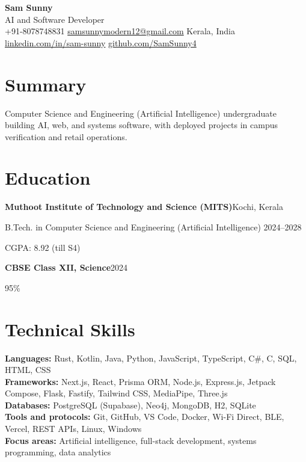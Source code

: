 \documentclass[a4paper,10pt]{article}
\newcommand{\entry}[2]{%
  \noindent\textbf{#1}\hfill{\small #2}\par
}
\begin{document}
\begin{center}
  {\LARGE\textbf{Sam Sunny}}\\[3pt]
  {\small AI and Software Developer}\\[4pt]
  {\small
    +91-8078748831 \textbar{}
    \href{mailto:samsunnymodern12@gmail.com}{samsunnymodern12@gmail.com} \textbar{}
    Kerala, India\\[2pt]
    \href{https://www.linkedin.com/in/sam-sunny-36b4772bb/}{linkedin.com/in/sam-sunny} \textbar{}
    \href{https://github.com/SamSunny4}{github.com/SamSunny4}
  }
\end{center}
\vspace{-7pt}

\section{Summary}
Computer Science and Engineering (Artificial Intelligence) undergraduate building AI, web, and systems software, with deployed projects in campus verification and retail operations.

\section{Education}
\entry{Muthoot Institute of Technology and Science (MITS)}{Kochi, Kerala}
{B.Tech. in Computer Science and Engineering (Artificial Intelligence) \hfill 2024--2028}\par
{CGPA: 8.92 (till S4)}\par
\entry{CBSE Class XII, Science}{2024}
{95\%}\par

\section{Technical Skills}
\small
\textbf{Languages:} Rust, Kotlin, Java, Python, JavaScript, TypeScript, C\#, C, SQL, HTML, CSS\\
\textbf{Frameworks:} Next.js, React, Prisma ORM, Node.js, Express.js, Jetpack Compose, Flask, Fastify, Tailwind CSS, MediaPipe, Three.js\\
\textbf{Databases:} PostgreSQL (Supabase), Neo4j, MongoDB, H2, SQLite\\
\textbf{Tools and protocols:} Git, GitHub, VS Code, Docker, Wi-Fi Direct, BLE, Vercel, REST APIs, Linux, Windows\\
\textbf{Focus areas:} Artificial intelligence, full-stack development, systems programming, data analytics
\normalsize
\end{document}

